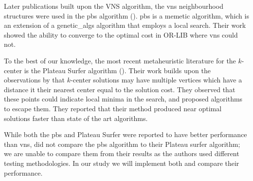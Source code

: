 Later publications built upon the VNS algorithm, the \acrshort{vns} neighbourhood structures were used in the \acrshort{pbs} algorithm (\cite{pullan_memetic_2008}). \acrshort{pbs} is a memetic algorithm, which is an extension of a \gls{genetic_algs} algorithm that employs a local search. Their work showed the ability to converge to the optimal cost in OR-LIB where \acrshort{vns} could not.

To the best of our knowledge, the most recent metaheuristic literature for the $k$-center is the Plateau Surfer algorithm (\cite{battiti_new_2017}). Their work builds upon the observations by \citeauthor{mladenovic_solving_2003} that $k$-center solutions may have multiple vertices which have a distance it their nearest center equal to the solution cost. They observed that these points could indicate local minima in the search, and proposed algorithms to escape them. They reported that their method produced near optimal solutions faster than state of the art algorithms.

While both the \acrshort{pbs} and Plateau Surfer were reported to have better performance than \acrshort{vns}, \citeauthor{battiti_new_2017} did not compare the \acrshort{pbs} algorithm to their Plateau surfer algorithm; we are unable to compare them from their results as the authors used different testing methodologies. In our study we will implement both and compare their performance.